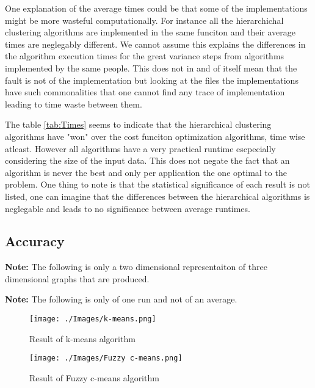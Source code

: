 \documentclass[12pt, a4paper]{article}
\begin{document}
One explanation of the average times could be that some of the implementations might be more wasteful computationally. For instance all the hierarchichal clustering algorithms are implemented in the same funciton and their average times are neglegably different. We cannot assume this explains the differences in the algorithm execution times for the great variance steps from algorithms implemented by the same people. This does not in and of itself mean that the fault is not of the implementation but looking at the files the implementations have such commonalities that one cannot find any trace of implementation leading to time waste between them.
\newline

The table \ref{tab:Times} seems to indicate that the hierarchical clustering algorithms have "won" over the cost funciton optimization algorithms, time wise atleast. However all algorithms have a very practical runtime escpecially considering the size of the input data. This does not negate the fact that an algorithm is never the best and only per application the one optimal to the problem. One thing to note is that the statistical significance of each result is not listed, one can imagine that the differences between the hierarchical algorithms is neglegable and leads to no significance between average runtimes.
\newline

\subsection{Accuracy}

\textbf{Note: } The following is only a two dimensional representaiton of three dimensional graphs that are produced.
\newline

\textbf{Note: } The following is only of one run and not of an average.
\newline

\begin{figure}[H]
    \begin{center}
        \texttt{[image: ./Images/k-means.png]}
    \end{center}
    \caption{Result of k-means algorithm}\label{fig:means}
\end{figure}

\begin{figure}[H]
    \begin{center}
        \texttt{[image: ./Images/Fuzzy c-means.png]}
    \end{center}
    \caption{Result of Fuzzy c-means algorithm}\label{fig:fuzz}
\end{figure}
\end{document}
